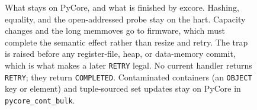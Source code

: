 \begin{figure}[p]
\centering
{}
\caption{What stays on PyCore, and what is finished by excore.
Hashing, equality, and the open-addressed probe stay on the hart.
Capacity changes and the long memmoves go to firmware, which must complete the semantic effect rather than resize and retry.
The trap is raised before any register-file, heap, or data-memory commit, which is what makes a later \texttt{RETRY} legal.
No current handler returns \texttt{RETRY}; they return \texttt{COMPLETED}.
Contaminated containers (an \texttt{OBJECT} key or element) and tuple-sourced set updates stay on PyCore in \texttt{pycore\_cont\_bulk}.}
\label{fig:split}
\end{figure}

